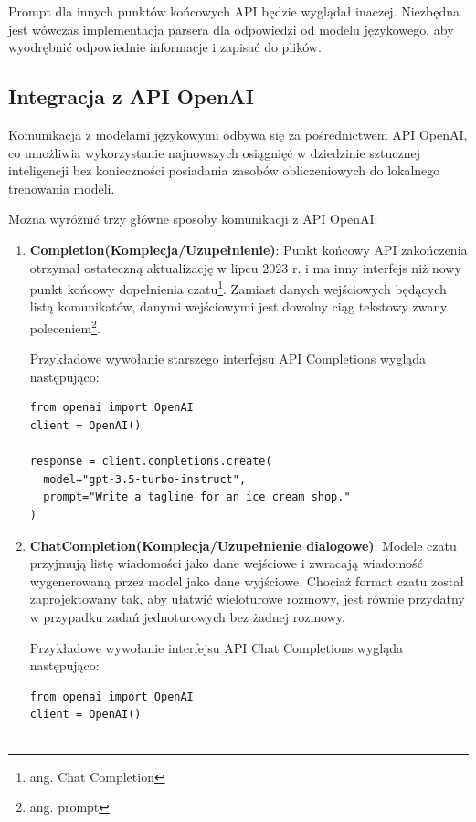 Prompt dla innych punktów końcowych API będzie wyglądał inaczej. Niezbędna jest wówczas implementacja parsera dla odpowiedzi od modelu językowego, aby wyodrębnić odpowiednie informacje i zapisać do plików.

\subsection{Integracja z API OpenAI}
\label{sec:integracja_openai}
Komunikacja z modelami językowymi odbywa się za pośrednictwem API OpenAI, co umożliwia wykorzystanie najnowszych osiągnięć w dziedzinie sztucznej inteligencji bez konieczności posiadania zasobów obliczeniowych do lokalnego trenowania modeli. 

Można wyróżnić trzy główne sposoby komunikacji z API OpenAI:
\begin{enumerate}
    \item \textbf{Completion(Komplecja/Uzupełnienie)}: Punkt końcowy API zakończenia otrzymał ostateczną aktualizację w lipcu 2023 r. i ma inny interfejs niż nowy punkt końcowy dopełnienia czatu\footnote{ang. Chat Completion}. Zamiast danych wejściowych będących listą komunikatów, danymi wejściowymi jest dowolny ciąg tekstowy zwany poleceniem\footnote{ang. prompt}.

    Przykładowe wywołanie starszego interfejsu API Completions wygląda następująco:
    \begin{listing}
        \begin{verbatim}
from openai import OpenAI
client = OpenAI()

response = client.completions.create(
  model="gpt-3.5-turbo-instruct",
  prompt="Write a tagline for an ice cream shop."
)
        \end{verbatim}
    \end{listing}
    \item \textbf{ChatCompletion(Komplecja/Uzupełnienie dialogowe)}: Modele czatu przyjmują listę wiadomości jako dane wejściowe i zwracają wiadomość wygenerowaną przez model jako dane wyjściowe. Chociaż format czatu został zaprojektowany tak, aby ułatwić wieloturowe rozmowy, jest równie przydatny w przypadku zadań jednoturowych bez żadnej rozmowy.

    Przykładowe wywołanie interfejsu API Chat Completions wygląda następująco:
    \begin{listing}[H]
        \begin{verbatim}
from openai import OpenAI
client = OpenAI()


\end{verbatim}
\end{listing}
\end{enumerate}
